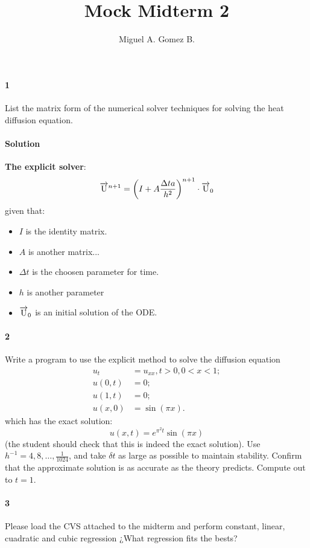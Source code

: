 \documentclass{article}
\title{Mock Midterm	2}
\author{Miguel A. Gomez B.}
\begin{document}
	\maketitle
	
\paragraph{1} List the matrix form of the numerical solver techniques for solving the heat diffusion equation.
\paragraph{Solution}
\textbf{The explicit solver}:
$$ \overrightarrow{\rm U}^{n+1} = \left(I + A\frac{\Delta t a}{h^2}\right)^{n+1} \cdot \overrightarrow{\rm U}_0$$
given that:
\begin{itemize}
	\item $I$ is the identity matrix.
	\item $A$ is another matrix...
	\item $\Delta t$ is the choosen parameter for time.
	\item $h$ is another parameter
	\item $\overrightarrow{\rm U}_0$ is an initial solution of the ODE.
\end{itemize}
\paragraph{2} Write a program to use the explicit method to solve the diffusion equation
\begin{align*}
	u_t &= u_{xx}, t > 0, 0 < x < 1;\\
	u(0, t) &= 0; \\
	u(1, t) &= 0; \\
	u(x, 0) &= \sin{(\pi x)}.
\end{align*}
which has the exact solution:
$$u(x, t) = e^{\pi^2 t} \sin{(\pi x)}$$
(the student should check that this is indeed the exact solution). Use $h^{-1} = 4, 8, \dots, \frac{1}{1024}$, and take $\delta t$ as large as possible to maintain stability. Confirm that the approximate solution is as accurate as the theory predicts. Compute out to $t = 1$.
\paragraph{3} Please load the CVS attached to the midterm and perform constant, linear, cuadratic and cubic regression ¿What regression fits the bests?
\end{document}
